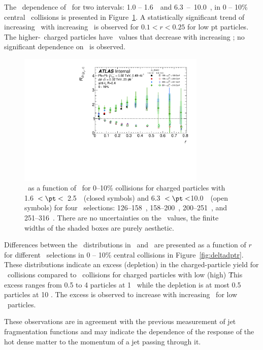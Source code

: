 The \ptjet\ dependence of \RDptr\ for two \pt intervals: 1.0 -- 1.6~\GeV\ and \mbox{6.3 -- 10.0~\GeV}, in 0 -- 10\% central \pbpb\ collisions is presented in Figure~\ref{fig:ptjetdep}. A statistically significant trend of increasing \RDptr\ with increasing \ptjet\ is observed for $0.1 < r < 0.25$ for low pt particles. The higher-\pt\ charged particles have \RDptr\ values that decrease with increasing \rvar; no significant dependence on \ptjet\ is observed. 

\begin{figure}[ht]
\centerline{
\includegraphics[width=0.8\textwidth]{figures/results/RDpT_final_ratio_dR_CONF_data_trk2_6_cent0.pdf} 
}
\caption{\RDptr\ as a function of \rvar\ for 0--10\% collisions for charged particles with 1.6~$< \pt <$~2.5~\GeV\
(closed symbols) and 6.3~$< \pt <$10.0~\GeV\ (open symbols) for four \ptjet\ selections: 126--158~\GeV, 158--200~\GeV,
200--251~\GeV, and 251--316~\GeV. There are no uncertainties on the \rvar\ values, the finite widths of the shaded boxes are purely aesthetic.}
\label{fig:ptjetdep}
\end{figure}



Differences between the \Dptr\ distributions in \pbpb\ and \pp\ are presented as a function of $r$ for different \pt\ selections in 0 -- 10\% central collisions in Figure~\ref{fig:deltadptr}. 
These distributions indicate an excess (depletion) in the charged-particle yield for \pbpb\ collisions compared to \pp\ collisions for charged particles with low (high) \pt\. This excess ranges from 0.5 to 4 particles at 1 \GeV\ while the depletion is at most 0.5 particles at 10 \GeV. The excess is observed to increase with increasing \ptjet\ for low \pt\ particles.


These observations are in agreement with the previous measurement of jet fragmentation functions \cite{Chatrchyan:2014ava, Sirunyan:2018jqr, Aaboud:2017bzv, PhysRevC.98.024908} and may indicate the dependence of the response of the hot dense matter to the momentum of a jet passing through it. 

